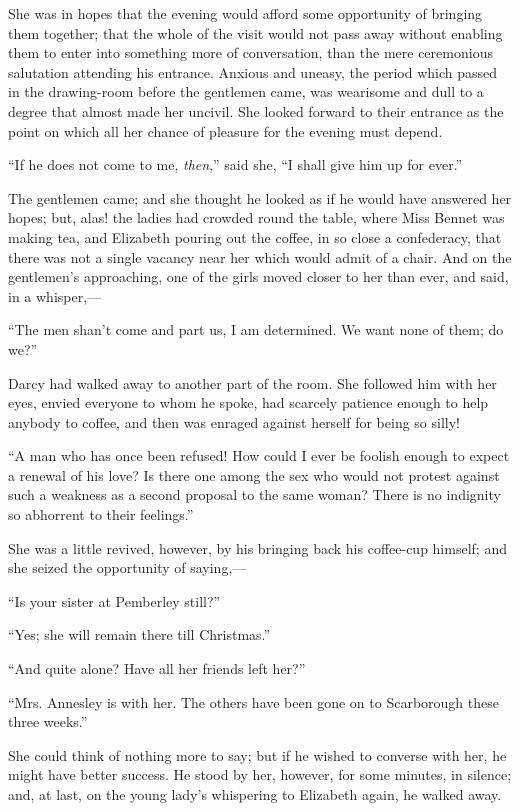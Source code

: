 She was in hopes that the evening would afford some opportunity of bringing them together; that the whole of the visit would not pass away without enabling them to enter into something more of conversation, than the mere ceremonious salutation attending his entrance. Anxious and uneasy, the period which passed in the drawing-room before the gentlemen came, was wearisome and dull to a degree that almost made her uncivil. She looked forward to their entrance as the point on which all her chance of pleasure for the evening must depend.

``If he does not come to me, \textit{then},'' said she, ``I shall give him up for ever.''

The gentlemen came; and she thought he looked as if he would have answered her hopes; but, alas! the ladies had crowded round the table, where Miss Bennet was making tea, and Elizabeth pouring out the coffee, in so close a confederacy, that there was not a single vacancy near her which would admit of a chair. And on the gentlemen's approaching, one of the girls moved closer to her than ever, and said, in a whisper,---

``The men shan't come and part us, I am determined. We want none of them; do we?''

Darcy had walked away to another part of the room. She followed him with her eyes, envied everyone to whom he spoke, had scarcely patience enough to help anybody to coffee, and then was enraged against herself for being so silly!

``A man who has once been refused! How could I ever be foolish enough to expect a renewal of his love? Is there one among the sex who would not protest against such a weakness as a second proposal to the same woman? There is no indignity so abhorrent to their feelings.''

She was a little revived, however, by his bringing back his coffee-cup himself; and she seized the opportunity of saying,---

``Is your sister at Pemberley still?''

``Yes; she will remain there till Christmas.''

``And quite alone? Have all her friends left her?''

``Mrs. Annesley is with her. The others have been gone on to Scarborough these three weeks.''

She could think of nothing more to say; but if he wished to converse with her, he might have better success. He stood by her, however, for some minutes, in silence; and, at last, on the young lady's whispering to Elizabeth again, he walked away.

